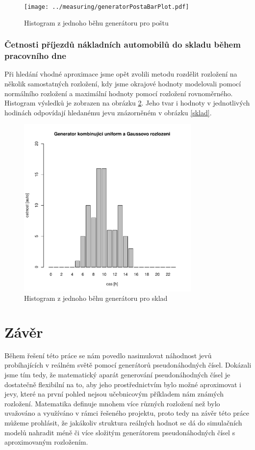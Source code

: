 \documentclass[12pt,a4paper]{article}
\begin{document}
		\begin{figure}[ht!]
		\centering
		\texttt{[image: ../measuring/generatorPostaBarPlot.pdf]}
		\caption{Histogram z jednoho běhu generátoru pro poštu}
		\label{genPosta}
		\end{figure}	

		\subsubsection{Četnosti příjezdů nákladních automobilů do skladu během pracovního dne}	
		Při hledání vhodné aproximace jsme opět zvolili metodu rozdělit rozložení na několik samostatných rozložení, kdy jsme okrajové hodnoty modelovali pomocí normálního rozložení a maximální hodnoty pomocí rozložení rovnoměrného. Histogram výsledků je zobrazen na obrázku \ref{genSklad}. Jeho tvar i hodnoty v jednotlivých hodinách odpovídají hledanému jevu znázorněném v obrázku \ref{sklad}.

		\begin{figure}[ht!]
		\centering
		\includegraphics[width=90mm]{../measuring/generatorSkladBarPlot.pdf}
		\caption{Histogram z jednoho běhu generátoru pro sklad}
		\label{genSklad}
		\end{figure}		

\section{Závěr}
Během řešení této práce se nám povedlo nasimulovat náhodnost jevů probíhajících v reálném světě pomocí generátorů 
pseudonáhodných čísel. Dokázali jsme tím tedy, že matematický aparát generování pseudonáhodných čísel je dostatečně
flexibilní na to, aby jeho prostřednictvím bylo možné aproximovat i jevy, které na první pohled nejsou učebnicovým příkladem 
nám známých rozložení. Matematika definuje mnohem více různých rozložení než bylo uvažováno a využíváno v rámci řešeného 
projektu, proto tedy na závěr této práce můžeme prohlásit, že jakákoliv struktura reálných hodnot se dá do simulačních
modelů nahradit méně či více složitým generátorem pseudonáhodných čísel s aproximovaným rozložením.
\end{document}
